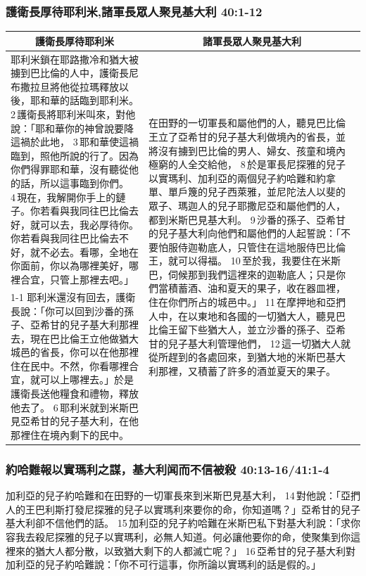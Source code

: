 \subsubsection{護衛長厚待耶利米,諸軍長眾人聚見基大利 40:1-12}
\begin{table}[H]
\centering
\begin{tabular}{p{8.5cm}|p{8.8cm}}\hline\hline
\multicolumn{1}{c|}{護衛長厚待耶利米}&\multicolumn{1}{c}{諸軍長眾人聚見基大利}\\\hline
耶利米鎖在耶路撒冷和猶大被擄到巴比倫的人中，護衛長尼布撒拉旦將他從拉瑪釋放以後，耶和華的話臨到耶利米。 2 護衛長將耶利米叫來，對他說：「耶和華你的神曾說要降這禍於此地， 3 耶和華使這禍臨到，照他所說的行了。因為你們得罪耶和華，沒有聽從他的話，所以這事臨到你們。 4 現在，我解開你手上的鏈子。你若看與我同往巴比倫去好，就可以去，我必厚待你。你若看與我同往巴比倫去不好，就不必去。看哪，全地在你面前，你以為哪裡美好，哪裡合宜，只管上那裡去吧。」
&\multirow{2}{9cm}{在田野的一切軍長和屬他們的人，聽見巴比倫王立了亞希甘的兒子基大利做境內的省長，並將沒有擄到巴比倫的男人、婦女、孩童和境內極窮的人全交給他， 8 於是軍長尼探雅的兒子以實瑪利、加利亞的兩個兒子約哈難和約拿單、單戶篾的兒子西萊雅，並尼陀法人以斐的眾子、瑪迦人的兒子耶撒尼亞和屬他們的人，都到米斯巴見基大利。 9 沙番的孫子、亞希甘的兒子基大利向他們和屬他們的人起誓說：「不要怕服侍迦勒底人，只管住在這地服侍巴比倫王，就可以得福。 10 至於我，我要住在米斯巴，伺候那到我們這裡來的迦勒底人；只是你們當積蓄酒、油和夏天的果子，收在器皿裡，住在你們所占的城邑中。」 11 在摩押地和亞捫人中，在以東地和各國的一切猶大人，聽見巴比倫王留下些猶大人，並立沙番的孫子、亞希甘的兒子基大利管理他們， 12 這一切猶大人就從所趕到的各處回來，到猶大地的米斯巴基大利那裡，又積蓄了許多的酒並夏天的果子。}\\\cline{1-1}
耶利米還沒有回去，護衛長說：「你可以回到沙番的孫子、亞希甘的兒子基大利那裡去，現在巴比倫王立他做猶大城邑的省長，你可以在他那裡住在民中。不然，你看哪裡合宜，就可以上哪裡去。」於是護衛長送他糧食和禮物，釋放他去了。 6 耶利米就到米斯巴見亞希甘的兒子基大利，在他那裡住在境內剩下的民中。&\\\hline
\end{tabular}
\end{table}


 
\subsubsection{約哈難報以實瑪利之謀，基大利闻而不信被殺 40:13-16/41:1-4}
加利亞的兒子約哈難和在田野的一切軍長來到米斯巴見基大利， 14 對他說：「亞捫人的王巴利斯打發尼探雅的兒子以實瑪利來要你的命，你知道嗎？」亞希甘的兒子基大利卻不信他們的話。 15 加利亞的兒子約哈難在米斯巴私下對基大利說：「求你容我去殺尼探雅的兒子以實瑪利，必無人知道。何必讓他要你的命，使聚集到你這裡來的猶大人都分散，以致猶大剩下的人都滅亡呢？」 16 亞希甘的兒子基大利對加利亞的兒子約哈難說：「你不可行這事，你所論以實瑪利的話是假的。」

